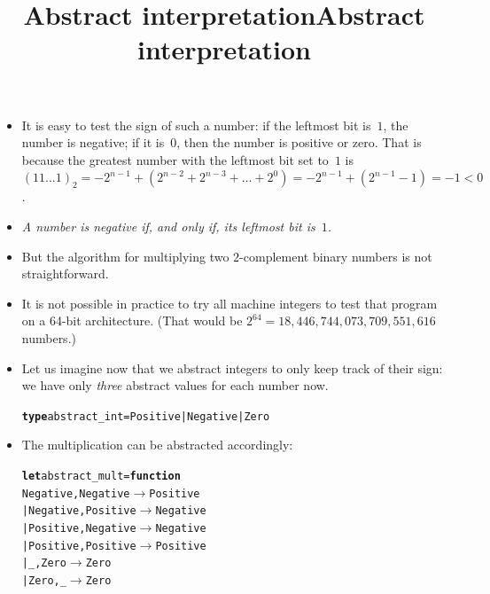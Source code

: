 \documentclass[wide]{slides}
\begin{document}
\begin{slide}
  \title{Abstract interpretation}

  \begin{itemize}

    \item It is easy to test the sign of such a number: if the
      leftmost bit is~\(1\), the number is negative; if it is~\(0\),
      then the number is positive or zero. That is because the
      greatest number with the leftmost bit set to~\(1\) is
      \((11...1)_2 = -2^{n-1} + (2^{n-2} + 2^{n-3} + \dots + 2^0) =
      -2^{n-1} + (2^{n-1} - 1) = -1 < 0\).

    \item \emph{A number is negative if, and only if, its leftmost bit
      is~\(1\).}

    \item But the algorithm for multiplying two \(2\)-complement
      binary numbers is not straightforward.

    \item It is not possible in practice to try all machine integers
      to test that program on a 64-bit architecture. (That would be
      \(2^{64} = 18,446,744,073,709,551,616\) numbers.)

  \end{itemize}

\end{slide}

\begin{slide}
  \title{Abstract interpretation}

  \begin{itemize}

    \item Let us imagine now that we abstract \OCaml integers to only
      keep track of their sign: we have only \emph{three} abstract
      values for each number now.
      \begin{alltt}

\textbf{type} abstract\_int = Positive | Negative | Zero
      \end{alltt}

    \item The multiplication can be abstracted accordingly:
      \medskip
\begin{alltt}
\textbf{let} abstract\_mult = \textbf{function}
  Negative, Negative \(\rightarrow\) Positive
| Negative, Positive \(\rightarrow\) Negative
| Positive, Negative \(\rightarrow\) Negative
| Positive, Positive \(\rightarrow\) Positive
|          _,      Zero \(\rightarrow\) Zero
|      Zero,          _ \(\rightarrow\) Zero

\end{alltt}

  \end{itemize}

\end{slide}
\end{document}
